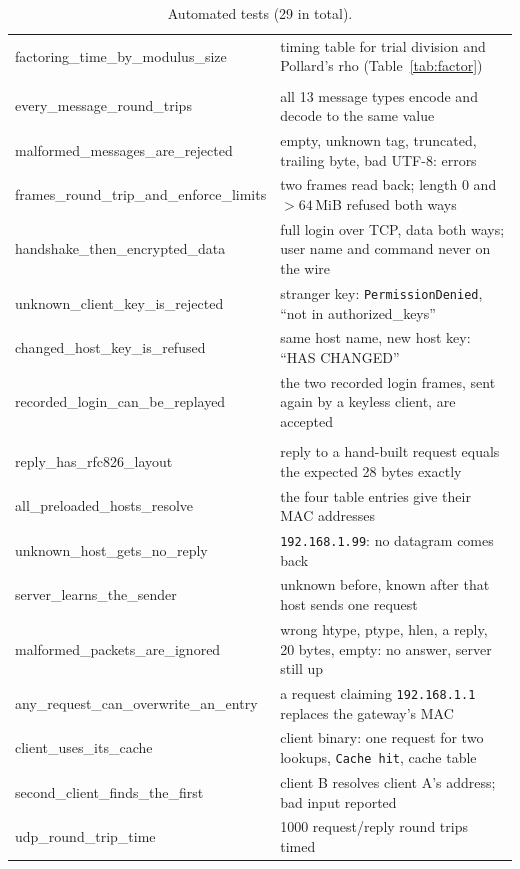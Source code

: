 \documentclass[11pt,a4paper]{article}
\begin{document}
\begin{table}[H]
\begin{tabularx}{\textwidth}{@{}>{\ttfamily\scriptsize}l X@{}}
factoring\_time\_by\_modulus\_size & timing table for trial division and Pollard's rho (Table~\ref{tab:factor}) \\
\multicolumn{2}{@{}l}{\textit{rsh-main/tests/protocol.rs}} \\
every\_message\_round\_trips & all 13 message types encode and decode to the same value \\
malformed\_messages\_are\_rejected & empty, unknown tag, truncated, trailing byte, bad UTF-8: errors \\
frames\_round\_trip\_and\_enforce\_limits & two frames read back; length 0 and $> 64$\,MiB refused both ways \\
handshake\_then\_encrypted\_data & full login over TCP, data both ways; user name and command never on the wire \\
unknown\_client\_key\_is\_rejected & stranger key: \texttt{PermissionDenied}, ``not in authorized\_keys'' \\
changed\_host\_key\_is\_refused & same host name, new host key: ``HAS CHANGED'' \\
recorded\_login\_can\_be\_replayed & the two recorded login frames, sent again by a keyless client, are accepted \\
\multicolumn{2}{@{}l}{\textit{arp/tests/arp.rs}} \\
reply\_has\_rfc826\_layout & reply to a hand-built request equals the expected 28 bytes exactly \\
all\_preloaded\_hosts\_resolve & the four table entries give their MAC addresses \\
unknown\_host\_gets\_no\_reply & \texttt{192.168.1.99}: no datagram comes back \\
server\_learns\_the\_sender & unknown before, known after that host sends one request \\
malformed\_packets\_are\_ignored & wrong htype, ptype, hlen, a reply, 20 bytes, empty: no answer, server still up \\
any\_request\_can\_overwrite\_an\_entry & a request claiming \texttt{192.168.1.1} replaces the gateway's MAC \\
client\_uses\_its\_cache & client binary: one request for two lookups, \texttt{Cache hit}, cache table \\
second\_client\_finds\_the\_first & client B resolves client A's address; bad input reported \\
udp\_round\_trip\_time & 1000 request/reply round trips timed \\
\bottomrule
\end{tabularx}
\caption{Automated tests (29 in total).}
\end{table}
\end{document}
